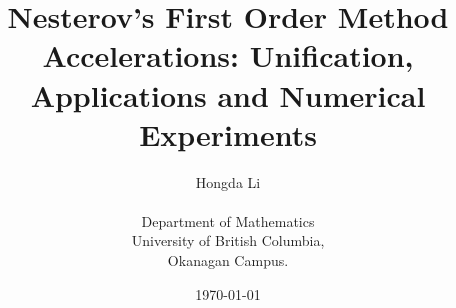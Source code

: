 \documentclass[12pt]{article}
\title{
    {
        \fontfamily{ptm}\selectfont 
        Nesterov's First Order Method Accelerations: Unification, Applications  and Numerical Experiments
    }
}
\author{
    Hongda Li\\[3ex]\\ Department of Mathematics\\
	University of British Columbia,\\
	Okanagan Campus.
}
\date{\today}
\begin{document}

\maketitle
\tableofcontents
\pagebreak





\end{document}
